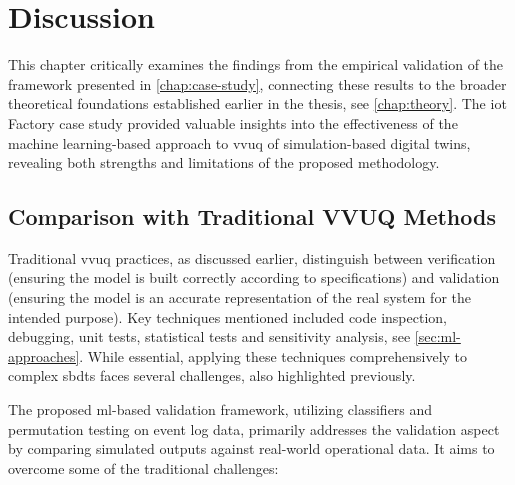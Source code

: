 \chapter{Discussion}
\label{chap:discussion}

This chapter critically examines the findings from the empirical validation of the framework presented in \autoref{chap:case-study}, connecting these results to the broader theoretical foundations established earlier in the thesis, see \autoref{chap:theory}. The \gls{iot} Factory case study provided valuable insights into the effectiveness of the machine learning-based approach to \gls{vvuq} of simulation-based digital twins, revealing both strengths and limitations of the proposed methodology.

\section{Comparison with Traditional VVUQ Methods}
\label{sec:comparison_manual}

Traditional \gls{vvuq} practices, as discussed earlier, distinguish between verification (ensuring the model is built correctly according to specifications) and validation (ensuring the model is an accurate representation of the real system for the intended purpose). Key techniques mentioned included code inspection, debugging, unit tests, statistical tests and sensitivity analysis, see \autoref{sec:ml-approaches}. While essential, applying these techniques comprehensively to complex \gls{sbdt}s faces several challenges, also highlighted previously.

The proposed \gls{ml}-based validation framework, utilizing classifiers and permutation testing on event log data, primarily addresses the validation aspect by comparing simulated outputs against real-world operational data. It aims to overcome some of the traditional challenges:

